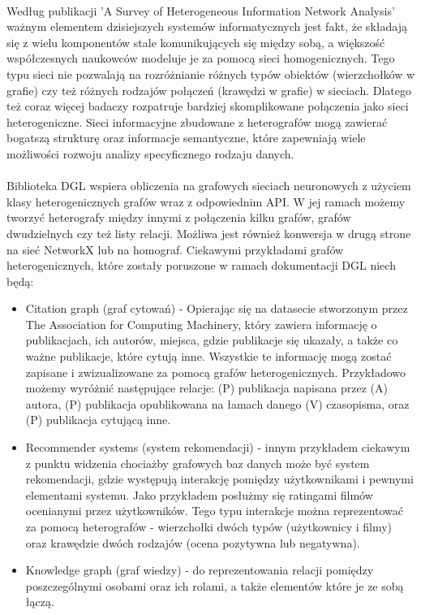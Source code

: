 \documentclass{article}
\begin{document}
\paragraph{}
Według publikacji 'A Survey of Heterogeneous Information Network Analysis' \cite{heteropaper} ważnym elementem dzisiejszych systemów informatycznych jest fakt, że składają się z wielu komponentów stale komunikujących się między sobą, a większość współczesnych naukowców modeluje je za pomocą sieci homogenicznych. Tego typu sieci nie pozwalają na rozróżnianie różnych typów obiektów (wierzchołków w grafie) czy też różnych rodzajów połączeń (krawędzi w grafie) w sieciach. Dlatego też coraz więcej badaczy rozpatruje bardziej skomplikowane połączenia jako sieci heterogeniczne. Sieci informacyjne zbudowane z heterografów mogą zawierać bogatszą strukturę oraz informacje semantyczne, które zapewniają wiele możliwości rozwoju analizy specyficznego rodzaju danych.

\paragraph{}
Biblioteka DGL wspiera obliczenia na grafowych sieciach neuronowych z użyciem klasy heterogenicznych grafów wraz z odpowiednim API. W jej ramach możemy tworzyć heterografy między innymi z połączenia kilku grafów, grafów dwudzielnych czy też listy relacji. Możliwa jest również konwersja w drugą strone na sieć NetworkX lub na homograf. Ciekawymi przykładami grafów heterogenicznych, które zostały poruszone w ramach dokumentacji DGL \cite{dgl} niech będą:

\begin{itemize}
  \item Citation graph (graf cytowań) - Opierając się na datasecie stworzonym przez The Association for Computing Machinery, który zawiera informację o publikacjach, ich autorów, miejsca, gdzie publikacje się ukazały, a także co ważne publikacje, które cytują inne. Wszystkie te informację mogą zostać zapisane i zwizualizowane za pomocą grafów heterogenicznych. Przykładowo możemy wyróżnić następujące relacje: (P) publikacja napisana przez (A) autora, (P) publikacja opublikowana na łamach danego (V) czasopisma, oraz (P) publikacja cytującą inne.
  
  \item Recommender systems (system rekomendacji) - innym przykładem ciekawym z punktu widzenia chociażby grafowych baz danych może być system rekomendacji, gdzie występują interakcję pomiędzy użytkownikami i pewnymi elementami systemu. Jako przykładem posłużmy się ratingami filmów ocenianymi przez użytkowników. Tego typu interakcje można reprezentować za pomocą heterografów - wierzchołki dwóch typów (użytkownicy i filmy) oraz krawędzie dwóch rodzajów (ocena pozytywna lub negatywna). 
  
  \item Knowledge graph (graf wiedzy) - do reprezentowania relacji pomiędzy poszczególnymi osobami oraz ich rolami,  a także elementów które je ze sobą łączą. 

\end{itemize}
\end{document}
